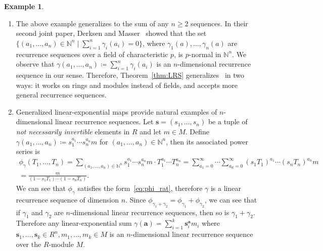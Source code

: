 \documentclass[letterpaper, 11pt, thm-restate]{article}
\numberwithin{equation}{section}
\newcommand{\N}{\mathbb{N}}
\newcommand{\ba}{\boldsymbol{a}}
\newcommand{\bs}{\boldsymbol{s}}
\theoremstyle{definition}
\theoremstyle{definition}
\newtheorem{example}[theorem]{Example}
\theoremstyle{definition}
\begin{document}
\begin{example}
\begin{enumerate}[label=(\roman*), topsep=0pt, itemsep=0em, leftmargin=0.7cm]
        \item The above example generalizes to the sum of any $n \geq 2$ sequences.
        In their second joint paper, Derksen and Masser~\cite{derksen2015linear} showed that the set $\{(a_1, \ldots, a_n) \in \N^n\mid \sum_{i=1}^n \gamma_i(a_i)=0\}$, where $\gamma_1(a),\ldots,\gamma_n(a)$ are recurrence sequences over a field of characteristic $p$, is $p$-normal in $\N^n$. 
        We observe that $\gamma(a_1, \ldots, a_n) \coloneqq \sum_{i=1}^n \gamma_i(a_i)$ is an $n$-dimensional recurrence sequence in our sense.
        Therefore, Theorem~\ref{thm:LRS} generalizes~\cite{derksen2015linear} in two ways: it works on rings and modules instead of fields, and accepts more general recurrence sequences.

        \item 
        Generalized linear-exponential maps provide natural examples of $n$-dimensional linear recurrence sequences.
        Let $\bs = (s_1, \ldots, s_n)$ be a tuple of \emph{not necessarily invertible} elements in $R$ and let $m \in M$.
        Define $\gamma(a_1, \ldots, a_n) \coloneqq s_1^{a_1} \cdots s_n^{a_n} m$ for $(a_1, \ldots, a_n) \in \N^n$, then its associated power series is 
        \begin{multline*}
        \phi_{\gamma}(T_1, \ldots, T_n)
         = \sum_{(a_1, \ldots, a_n) \in \N^n}  s_1^{a_1} \cdots s_n^{a_n} m \cdot T_1^{a_1} \cdots T_n^{a_n}
         = \sum_{a_1 = 0}^{\infty} \cdots \sum_{a_d = 0}^{\infty}  (s_1T_1)^{a_1} \cdots (s_nT_n)^{a_n} m \\
         = \frac{m}{(1 - s_1T_1) \cdots (1 - s_nT_n)}.
        \end{multline*}
        We can see that $\phi_{\gamma}$ satisfies the form~\eqref{eq:phi_rat}, therefore $\gamma$ is a linear recurrence sequence of dimension $n$.
        Since $\phi_{\gamma_1 + \gamma_2} = \phi_{\gamma_1} + \phi_{\gamma_2}$, we can see that if $\gamma_1$ and $\gamma_2$ are $n$-dimensional linear recurrence sequences, then so is $\gamma_1 + \gamma_2$.
        Therefore any linear-exponential sum $\gamma(\ba) = \sum_{i=1}^k \bs_i^{\ba} m_i$ where $\bs_1, \ldots, \bs_k \in R^n, m_1, \ldots, m_k \in M$ is an $n$-dimensional linear recurrence sequence over the $R$-module $M$.


\end{enumerate}
\end{example}
\end{document}
